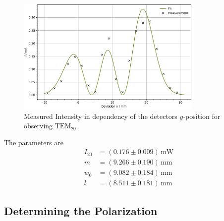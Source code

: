 \begin{figure}
	\centering
	\includegraphics[width=0.8\textwidth]{content/plots/TEM02.pdf}
	\caption{Measured Intensity in dependency of the detectors $y$-position for observing $\text{TEM}_{20}$.}
	\label{fig:TEM02}
\end{figure}
The parameters are
\begin{align*}
    I_{20} &= \left( 0.176\pm0.009 \right) \, \text{mW} \\
    m &= \left( 9.266\pm0.190 \right) \, \text{mm} \\
    w_0 &= \left( 9.082\pm0.184 \right) \, \text{mm} \\
    l &= \left( 8.511\pm0.181 \right) \, \text{mm}
\end{align*}

\subsection{Determining the Polarization}

